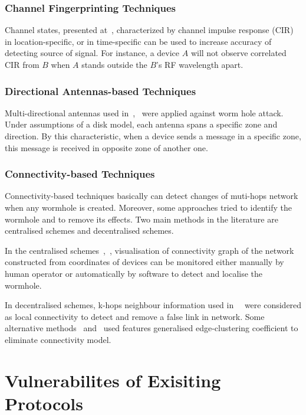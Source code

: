 \subsubsection*{Channel Fingerprinting Techniques}

Channel states, presented at~\cite{4289438, LiangXiao2008,LiangXiao2009,Liu:2009:SWC:1823633}, characterized by channel impulse response (CIR) in location-specific, or in time-specific can be used to increase accuracy of detecting source of signal. For instance, a device $A$ will not observe correlated CIR from $B$ when $A$ stands outside the $B$'s RF wavelength apart.

\subsubsection*{Directional Antennas-based Techniques}

Multi-directional antennas used in~\cite{Hu04usingdirectional},~\cite{RuiZhang2010} were applied against worm hole attack. Under assumptions of a disk model, each antenna spans a specific zone and direction. By this characteristic, when a device sends a message in a specific zone, this message is received in opposite zone of another one. 

\subsubsection*{Connectivity-based Techniques}

Connectivity-based techniques basically can detect changes of muti-hops network when any wormhole is created. Moreover, some approaches tried to identify the wormhole and to remove its effects. Two main methods in the literature are centralised schemes and decentralised schemes. 

In the centralised schemes~\cite{RuiZhang2010},~\cite{WeichaoWang2007}, visualisation of connectivity graph of the network constructed from coordinates of devices can be monitored either manually by human operator or automatically by software to detect and localise the wormhole. 

In decentralised schemes, k-hops neighbour information used in~\cite{RiteshMaheshwari}~\cite{4699583} were considered as local connectivity to detect and remove a false link in network. Some alternative methods~\cite{RiteshMaheshwari} and~\cite{5993472} used features generalised edge-clustering coefficient to eliminate connectivity model.

\section{Vulnerabilites of Exisiting Protocols}


